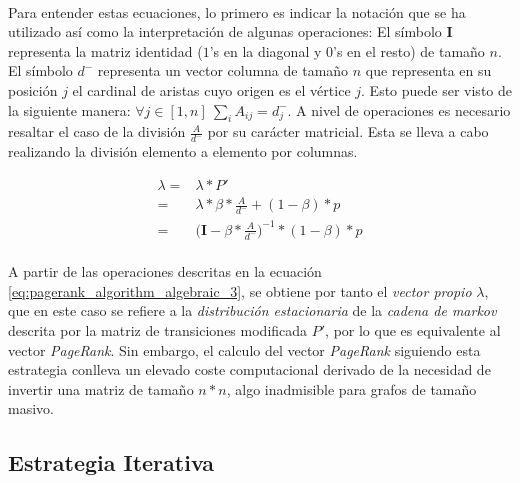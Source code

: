 \documentclass{subfiles}
\begin{document}
        \paragraph{}
        Para entender estas ecuaciones, lo primero es indicar la notación que se ha utilizado así como la interpretación de algunas operaciones: El símbolo $\boldsymbol{I}$ representa la matriz identidad ($1$'s en la diagonal y $0$'s en el resto) de tamaño $n$. El símbolo $d^-$ representa un vector columna de tamaño $n$ que representa en su posición $j$ el cardinal de aristas cuyo origen es el vértice $j$. Esto puede ser visto de la siguiente manera: $\forall j \in [1,n] \ \sum_i A_{ij} = d^{-}_{j}$. A nivel de operaciones es necesario resaltar el caso de la división $\frac{A}{d^-}$ por su carácter matricial. Esta se lleva a cabo realizando la división elemento a elemento por columnas.

        \begin{align}
          \label{eq:pagerank_algorithm_algebraic_1}
          \lambda =& \lambda * P' \\
          \label{eq:pagerank_algorithm_algebraic_2}
                  =& \lambda * \beta * \frac{A}{d^-} + (1-\beta)*p \\
          \label{eq:pagerank_algorithm_algebraic_3}
                  =& \bigg(\boldsymbol{I} - \beta * \frac{A}{d^-}\bigg)^{-1} * (1-\beta)*p
        \end{align}

        \paragraph{}
        A partir de las operaciones descritas en la ecuación \eqref{eq:pagerank_algorithm_algebraic_3}, se obtiene por tanto el \emph{vector propio} $\lambda$, que en este caso se refiere a la \emph{distribución estacionaria} de la \emph{cadena de markov} descrita por la matriz de transiciones modificada $P'$, por lo que es equivalente al vector \emph{PageRank}. Sin embargo, el calculo del vector \emph{PageRank} siguiendo esta estrategia conlleva un elevado coste computacional derivado de la necesidad de invertir una matriz de tamaño $n*n$, algo inadmisible para grafos de tamaño masivo.

      \subsection{Estrategia Iterativa}
      \label{sec:pagerank_algorithm_iterative}
\end{document}
